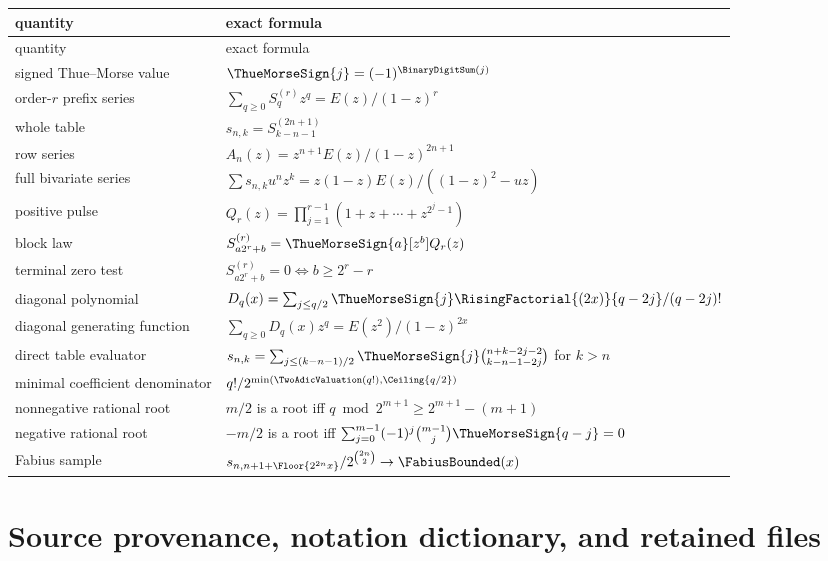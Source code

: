 \documentclass[11pt,oneside]{article}
\numberwithin{equation}{section}
\theoremstyle{definition}
\theoremstyle{remark}
\begin{document}
\begin{longtable}{p{}p{}}
\toprule
quantity & exact formula \\
\midrule
\endfirsthead
\toprule
quantity & exact formula \\
\midrule
\endhead
signed Thue--Morse value
& \(\ThueMorseSign{j}=(-1)^{\BinaryDigitSum(j)}\) \\
order-\(r\) prefix series
& \(\sum_{q\geq0}S_{q}^{(r)}z^q=E(z)/(1-z)^r\) \\
whole table
& \(s_{n,k}=S_{k-n-1}^{(2n+1)}\) \\
row series
& \(A_n(z)=z^{n+1}E(z)/(1-z)^{2n+1}\) \\
full bivariate series
& \(\sum s_{n,k}u^nz^k=z(1-z)E(z)/((1-z)^2-uz)\) \\
positive pulse
& \(Q_r(z)=\prod_{j=1}^{r-1}(1+z+\cdots+z^{2^j-1})\) \\
block law
& \(S_{a2^r+b}^{(r)}=\ThueMorseSign{a}[z^b]Q_r(z)\) \\
terminal zero test
& \(S_{a2^r+b}^{(r)}=0\iff b\geq2^r-r\) \\
diagonal polynomial
& \(D_q(x)=\sum_{j\leq q/2}\ThueMorseSign{j}\RisingFactorial{(2x)}{q-2j}/(q-2j)!\) \\
diagonal generating function
& \(\sum_{q\geq0}D_q(x)z^q=E(z^2)/(1-z)^{2x}\) \\
direct table evaluator
& \(s_{n,k}=\sum_{j\leq(k-n-1)/2}\ThueMorseSign{j}
\binom{n+k-2j-2}{k-n-1-2j}\) for \(k>n\) \\
minimal coefficient denominator
& \(q!/2^{\min(\TwoAdicValuation(q!),\Ceiling{q/2})}\) \\
nonnegative rational root
& \(m/2\) is a root iff
\(q\bmod2^{m+1}\geq2^{m+1}-(m+1)\) \\
negative rational root
& \(-m/2\) is a root iff
\(\sum_{j=0}^{m-1}(-1)^j\binom{m-1}{j}\ThueMorseSign{q-j}=0\) \\
Fabius sample
& \(s_{n,n+1+\Floor{2^{2n}x}}/2^{\binom{2n}{2}}\to \FabiusBounded(x)\) \\
\bottomrule
\end{longtable}


\section{Source provenance, notation dictionary, and retained files}
\label{p3:app:provenance}
\end{document}
